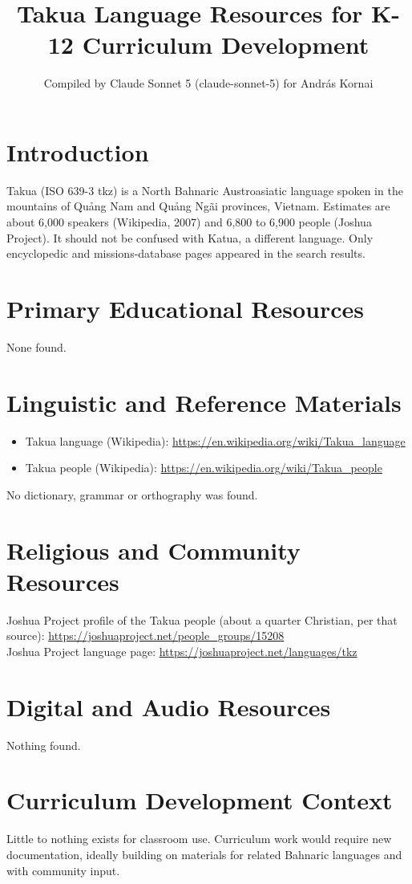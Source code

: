 \documentclass[12pt]{article}
\title{Takua Language Resources for K-12 Curriculum Development}
\author{Compiled by Claude Sonnet 5 (claude-sonnet-5) for Andr\'as Kornai}
\date{}
\begin{document}
\maketitle

\section{Introduction}
Takua (ISO 639-3 tkz) is a North Bahnaric Austroasiatic language spoken in the mountains of Qu\h{a}ng Nam and Qu\h{a}ng Ng\~ai provinces, Vietnam. Estimates are about 6,000 speakers (Wikipedia, 2007) and 6,800 to 6,900 people (Joshua Project). It should not be confused with Katua, a different language. Only encyclopedic and missions-database pages appeared in the search results.

\section{Primary Educational Resources}
None found.

\section{Linguistic and Reference Materials}
\begin{itemize}
\item Takua language (Wikipedia): \url{https://en.wikipedia.org/wiki/Takua_language}
\item Takua people (Wikipedia): \url{https://en.wikipedia.org/wiki/Takua_people}
\end{itemize}
No dictionary, grammar or orthography was found.

\section{Religious and Community Resources}
Joshua Project profile of the Takua people (about a quarter Christian, per that source): \url{https://joshuaproject.net/people_groups/15208}\\
Joshua Project language page: \url{https://joshuaproject.net/languages/tkz}

\section{Digital and Audio Resources}
Nothing found.

\section{Curriculum Development Context}
Little to nothing exists for classroom use. Curriculum work would require new documentation, ideally building on materials for related Bahnaric languages and with community input.
\end{document}
